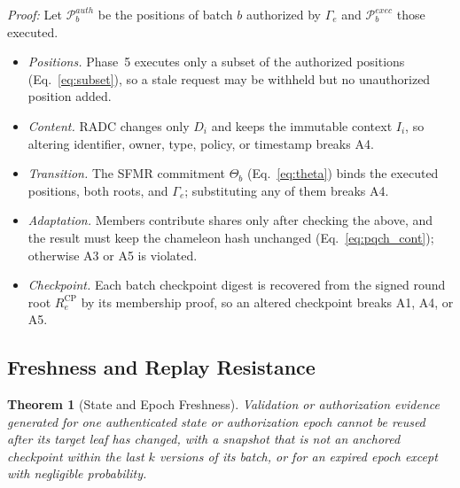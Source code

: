 \documentclass[lettersize,journal]{IEEEtran}
\newtheorem{theorem}{Theorem}
\begin{document}
\emph{Proof:} Let $\mathcal{P}_b^{auth}$ be the positions of batch $b$
authorized by $\Gamma_e$ and $\mathcal{P}_b^{exec}$ those executed.
\begin{itemize}[leftmargin=*,nosep]
\item \emph{Positions.} Phase~5 executes only a subset of the authorized
positions (Eq.~\eqref{eq:subset}), so a stale request may be withheld
but no unauthorized position added.
\item \emph{Content.} RADC changes only $D_i$ and keeps the immutable
context $I_i$, so altering identifier, owner, type, policy, or timestamp
breaks A4.
\item \emph{Transition.} The SFMR commitment $\Theta_b$
(Eq.~\eqref{eq:theta}) binds the executed positions, both roots, and
$\Gamma_e$; substituting any of them breaks A4.
\item \emph{Adaptation.} Members contribute shares only after checking
the above, and the result must keep the chameleon hash unchanged
(Eq.~\eqref{eq:pqch_cont}); otherwise A3 or A5 is violated.
\item \emph{Checkpoint.} Each batch checkpoint digest is recovered from
the signed round root $R_e^{\mathrm{CP}}$ by its membership proof, so an
altered checkpoint breaks A1, A4, or A5.
\end{itemize}

\subsection{Freshness and Replay Resistance}

\begin{theorem}[State and Epoch Freshness]
Validation or authorization evidence generated for one authenticated
state or authorization epoch cannot be reused after its
target leaf has changed, with a snapshot that is not an anchored
checkpoint within the last $k$ versions of its batch, or for an expired
epoch except with negligible probability.
\end{theorem}
\end{document}
